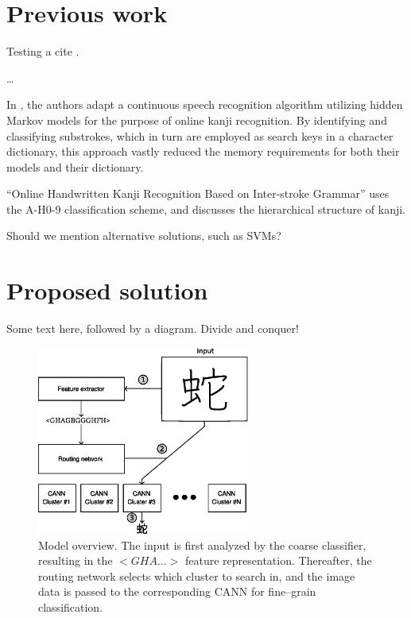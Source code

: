 \documentclass[10pt,conference,a4paper]{IEEEtran}
\begin{document}
	 
	\section{Previous work}

	Testing a cite \cite{zhu2014robust}.

	\ldots

	In \cite{nakai2001substroke}, the authors adapt a continuous speech recognition algorithm utilizing
	hidden Markov models for the purpose of online kanji recognition. By identifying and classifying
	substrokes, which in turn are employed as search keys in a character dictionary, this approach vastly
	reduced the memory requirements for both their models and their dictionary.


	``Online Handwritten Kanji Recognition Based on Inter-stroke Grammar'' uses the A-H0-9 classification scheme,
	and discusses the hierarchical structure of kanji.

	Should we mention alternative solutions, such as SVMs?



	\section{Proposed solution}

	Some text here, followed by a diagram. Divide and conquer!

	\begin{figure}
		\centering
		\includegraphics[width=2.75in]{./fig/model-overview.eps}
		\caption{Model overview. The input is first analyzed by the coarse classifier, resulting in the $<GHA\ldots>$ feature representation.
		Thereafter, the routing network selects which cluster to search in, and the image data is passed to the corresponding CANN for fine--grain classification.}
		\label{fig_model_overview}
	\end{figure}
\end{document}
